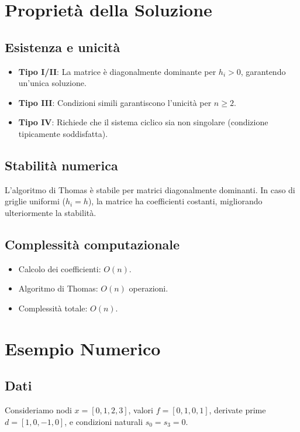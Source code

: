 \documentclass[12pt]{article}
\begin{document}
\section{Proprietà della Soluzione}

\subsection{Esistenza e unicità}
\begin{itemize}
\item \textbf{Tipo I/II}: La matrice è diagonalmente dominante per $h_i > 0$, garantendo un'unica soluzione.
\item \textbf{Tipo III}: Condizioni simili garantiscono l'unicità per $n \geq 2$.
\item \textbf{Tipo IV}: Richiede che il sistema ciclico sia non singolare (condizione tipicamente soddisfatta).
\end{itemize}

\subsection{Stabilità numerica}
L'algoritmo di Thomas è stabile per matrici diagonalmente dominanti. In caso di griglie uniformi ($h_i = h$), la matrice ha coefficienti costanti, migliorando ulteriormente la stabilità.

\subsection{Complessità computazionale}
\begin{itemize}
\item Calcolo dei coefficienti: $O(n)$.
\item Algoritmo di Thomas: $O(n)$ operazioni.
\item Complessità totale: $O(n)$.
\end{itemize}

\section{Esempio Numerico}

\subsection{Dati}
Consideriamo nodi $x = [0, 1, 2, 3]$, valori $f = [0, 1, 0, 1]$, derivate prime $d = [1, 0, -1, 0]$, e condizioni naturali $s_0 = s_3 = 0$.
\end{document}

